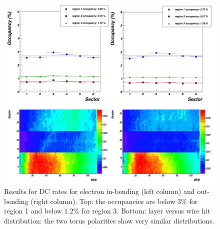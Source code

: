 \begin{figure}
	\centering
	\includegraphics[width=0.95\columnwidth,keepaspectratio]{img/dcOccupancy.png}
	\caption{Results for DC rates for electron in-bending (left column) and out-bending (right column).
				Top: the occupancies are below $3\%$ for region 1 and below $1.2\%$ for region 3. Bottom: layer
				versus wire hit distribution: the two torus polarities show very similar distributions.}
	\label{fig:dcOccupancy}
\end{figure}

